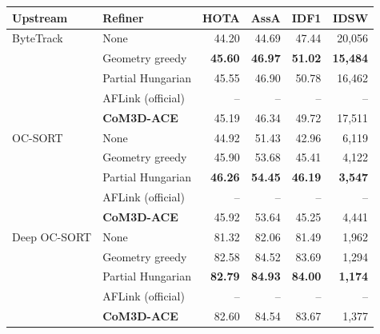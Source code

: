 \begin{tabular}{llrrrr}
\toprule
Upstream & Refiner & HOTA & AssA & IDF1 & IDSW \\
\midrule
ByteTrack & None & 44.20 & 44.69 & 47.44 & 20,056 \\
 & Geometry greedy & \textbf{45.60} & \textbf{46.97} & \textbf{51.02} & \textbf{15,484} \\
 & Partial Hungarian & 45.55 & 46.90 & 50.78 & 16,462 \\
 & AFLink (official) & -- & -- & -- & -- \\
 & \textbf{CoM3D-ACE} & 45.19 & 46.34 & 49.72 & 17,511 \\
\midrule
OC-SORT & None & 44.92 & 51.43 & 42.96 & 6,119 \\
 & Geometry greedy & 45.90 & 53.68 & 45.41 & 4,122 \\
 & Partial Hungarian & \textbf{46.26} & \textbf{54.45} & \textbf{46.19} & \textbf{3,547} \\
 & AFLink (official) & -- & -- & -- & -- \\
 & \textbf{CoM3D-ACE} & 45.92 & 53.64 & 45.25 & 4,441 \\
\midrule
Deep OC-SORT & None & 81.32 & 82.06 & 81.49 & 1,962 \\
 & Geometry greedy & 82.58 & 84.52 & 83.69 & 1,294 \\
 & Partial Hungarian & \textbf{82.79} & \textbf{84.93} & \textbf{84.00} & \textbf{1,174} \\
 & AFLink (official) & -- & -- & -- & -- \\
 & \textbf{CoM3D-ACE} & 82.60 & 84.54 & 83.67 & 1,377 \\
\bottomrule
\end{tabular}
